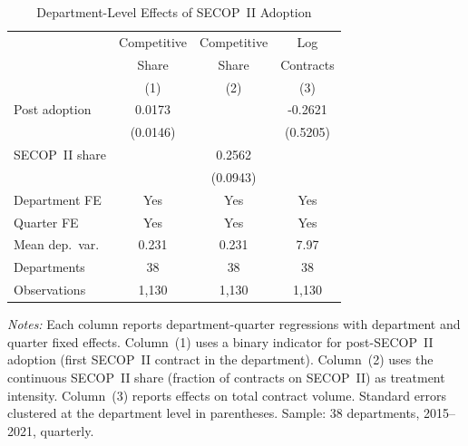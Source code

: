 \begin{table}
\begin{threeparttable}[t]
\centering
\caption{Department-Level Effects of SECOP~II Adoption}
\label{tab:main_did}
\small
\begin{tabular}{lccc}
\toprule
 & Competitive & Competitive & Log \\
 & Share & Share & Contracts \\
 & (1) & (2) & (3) \\
\midrule
Post adoption & 0.0173 & & -0.2621 \\
 & (0.0146) & & (0.5205) \\
SECOP~II share & & 0.2562 & \\
 & & (0.0943) & \\
\midrule
Department FE & Yes & Yes & Yes \\
Quarter FE & Yes & Yes & Yes \\
Mean dep.\ var. & 0.231 & 0.231 & 7.97 \\
Departments & 38 & 38 & 38 \\
Observations & 1,130 & 1,130 & 1,130 \\
\bottomrule
\end{tabular}
\begin{tablenotes}[flushleft]\small
\item \textit{Notes:} Each column reports department-quarter regressions with department and quarter fixed effects. Column~(1) uses a binary indicator for post-SECOP~II adoption (first SECOP~II contract in the department). Column~(2) uses the continuous SECOP~II share (fraction of contracts on SECOP~II) as treatment intensity. Column~(3) reports effects on total contract volume. Standard errors clustered at the department level in parentheses. Sample: 38 departments, 2015--2021, quarterly.
\end{tablenotes}
\end{threeparttable}
\end{table}
